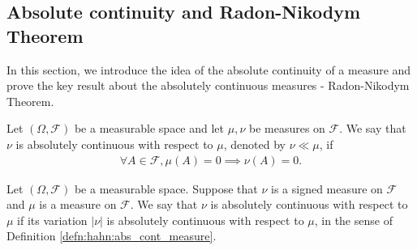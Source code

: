 \subsection{Absolute continuity and Radon-Nikodym Theorem}
In this section, we introduce the idea of the absolute continuity of a measure and prove the key result about the absolutely continuous measures - Radon-Nikodym Theorem.

\begin{definition}
\label{defn:hahn:abs_cont_measure}
Let $(\Omega, \mathcal{F})$ be a measurable space and let $\mu, \nu$ be measures on $\mathcal{F}$.
We say that $\nu$ is absolutely continuous with respect to $\mu$, denoted by $\nu \ll \mu$, if 
\begin{align*}
    \forall A \in \mathcal{F}, \mu(A) = 0 \implies \nu(A) = 0.
\end{align*}
\end{definition}

\begin{definition}
Let $(\Omega, \mathcal{F})$ be a measurable space. Suppose that $\nu$ is a signed measure on $\mathcal{F}$ and $\mu$ is a measure on $\mathcal{F}$. 
We say that $\nu$ is absolutely continuous with respect to $\mu$ if its variation $|\nu|$ is absolutely continuous with respect to $\mu$, in the sense of Definition \ref{defn:hahn:abs_cont_measure}.
\end{definition}

